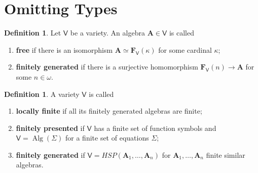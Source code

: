 \documentclass{amsart}
\theoremstyle{plain}
\theoremstyle{definition}
\newtheorem{definition}[theorem]{Definition}
\theoremstyle{remark}
\DeclareMathOperator{\Alg}{Alg}
\begin{document}
\section{Omitting Types}

\begin{definition}
    Let $\mathsf{V}$ be a variety. 
    An algebra $\mathbf{A} \in \mathsf{V}$ is called
    \begin{enumerate}
        \item \textbf{free} if there is an isomorphism $\mathbf{A} \simeq \mathbf{F}_{\mathsf{V}}(\kappa)$ for some cardinal $\kappa$; 
        \item \textbf{finitely generated} if there is a surjective homomorphism $\mathbf{F}_{\mathsf{V}}(n) \to \mathbf{A}$ for some $n \in \omega$. 
    \end{enumerate} 
\end{definition}

\begin{definition}
    A variety $\mathsf{V}$ is called 
    \begin{enumerate}
    \item \textbf{locally finite} if all its finitely generated algebras are finite; 
    \item \textbf{finitely presented} if $\mathsf{V}$ has a finite set of function symbols and $\mathsf{V}= \Alg(\Sigma)$ for a finite set of equations $\Sigma$; 
    \item \textbf{finitely generated} if $\mathsf{V}=HSP(\mathbf{A}_1, \ldots, \mathbf{A}_n)$ for $\mathbf{A}_1, \ldots, \mathbf{A}_n$ finite similar algebras. 
    \end{enumerate}
\end{definition}
\end{document}
